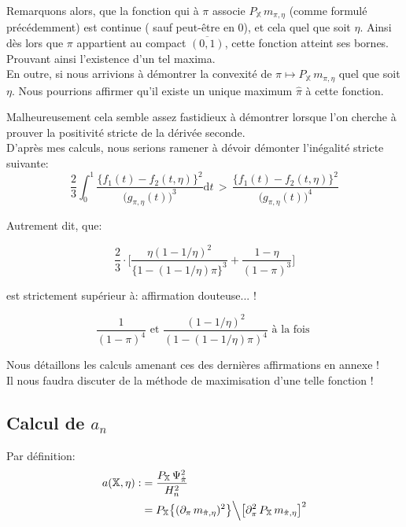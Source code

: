 \documentclass{article}
\begin{document}
    Remarquons alors, que la fonction qui à $\pi$ associe $P_{\mathbb{X}}\, m_{\pi,\eta}$ (comme formulé précédemment) est continue ({\color{red} sauf peut-être en 0}), et cela quel que soit $\eta$. Ainsi dès lors que $\pi$ appartient au compact $\overline{(0,1)}$, cette fonction atteint ses bornes. Prouvant ainsi l'existence d'un tel maxima. \\

    En outre, si nous arrivions à démontrer la convexité de $\pi\longmapsto P_{\mathbb{X}}\,m_{\pi,\eta}$ quel que soit $\eta$. Nous pourrions affirmer qu'il existe un unique maximum $\hat\pi$ à cette fonction. \\

    {\color{green} Malheureusement cela semble assez fastidieux à démontrer lorsque l'on cherche à prouver la positivité stricte de la dérivée seconde. \\
    
    D'après mes calculs, nous serions ramener à dévoir démonter l'inégalité stricte suivante:
    $$ \dfrac{2}{3}\int_0^1\dfrac{\big\{f_1(t)-f_2(t,\eta)\big\}^2}{\Big(g_{\pi,\eta}(t))^3}\mathrm{d}t\,>\,\dfrac{\big\{f_1(t)-f_2(t,\eta)\big\}^2}{\Big(g_{\pi,\eta}(t))^4} $$
    
    Autrement dit, que:

    $$\dfrac{2}{3}\cdot\Big[ \dfrac{\eta(1-1/\eta)^2}{\{1-(1-1/\eta)\pi\}^3} + \dfrac{1-\eta}{(1-\pi)^3} \Big]$$

    est strictement supérieur à: {\color{red} affirmation douteuse... !}

    $$ \dfrac{1}{(1-\pi)^4} \mbox{ et } \dfrac{(1-1/\eta)^2}{(1-(1-1/\eta)\pi)^4} \mbox{ à la fois }$$
    }
    {\color{red} Nous détaillons les calculs amenant ces des dernières affirmations en annexe !} \\


    Il nous faudra discuter de la méthode de maximisation d'une telle fonction ! 

    \subsection{Calcul de $a_n$}

    Par définition:
    \begin{align*}
        a(\mathbb{X,\eta}) :&= \dfrac{P_\mathbb{X}\,\Psi^2_{\hat\pi}}{H_n^2} \\
                            &= P_\mathbb{X}\big\{ (\partial_\pi\,m_{\hat\pi,\eta})^2 \big\} \Big\backslash \big[ \partial^2_\pi\,P_\mathbb{X}\,m_{\hat\pi,\eta} \big]^2
    \end{align*}
\end{document}
